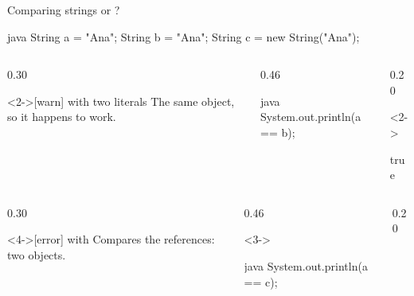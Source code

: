 \documentclass[\deckoptions]{beamer}
\begin{document}
\begin{frame}[fragile]{Comparing strings}{\code{==} or ?}
\begin{codeblock}[compact]{java}
String a = "Ana";
String b = "Ana";
String c = new String("Ana");
\end{codeblock}
  \blockgap
  \begin{boxrow}
  \begin{columns}[c, onlytextwidth]
    \begin{column}{0.30\textwidth}
      \begin{card}<2->[warn]{\code{==} with two literals}
        The same object, so it happens to work.
      \end{card}
    \end{column}
    \begin{column}{0.46\textwidth}
\begin{codeblock}{java}
System.out.println(a == b);
\end{codeblock}
    \end{column}
    \begin{column}{0.20\textwidth}
      \begin{uncoverenv}<2->
\begin{console}
true
\end{console}
      \end{uncoverenv}
    \end{column}
  \end{columns}
  \end{boxrow}
  \boxrowgap
  \begin{boxrow}
  \begin{columns}[c, onlytextwidth]
    \begin{column}{0.30\textwidth}
      \begin{card}<4->[error]{\code{==} with }
        Compares the references: two objects.
      \end{card}
    \end{column}
    \begin{column}{0.46\textwidth}
      \begin{uncoverenv}<3->
\begin{codeblock}{java}
System.out.println(a == c);
\end{codeblock}
      \end{uncoverenv}
    \end{column}
    \begin{column}{0.20\textwidth}

\end{column}
\end{columns}
\end{boxrow}
\end{frame}
\end{document}
